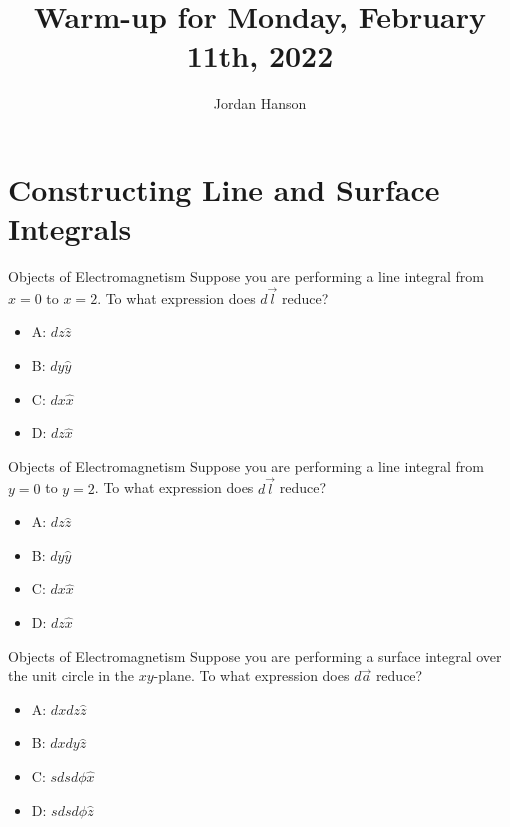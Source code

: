 \documentclass{beamer}
\title{Warm-up for Monday, February 11th, 2022}
\author{Jordan Hanson}
\institute{Whittier College Department of Physics and Astronomy}
\begin{document}
\maketitle

\section{Constructing Line and Surface Integrals}

\begin{frame}{Objects of Electromagnetism}
Suppose you are performing a line integral from $x = 0$ to $x = 2$.  To what expression does $d\vec{l}$ reduce?
\begin{itemize}
\item A: $dz \hat{z}$
\item B: $dy \hat{y}$
\item C: $dx \hat{x}$
\item D: $dz \hat{x}$
\end{itemize}
\end{frame}

\begin{frame}{Objects of Electromagnetism}
Suppose you are performing a line integral from $y = 0$ to $y = 2$.  To what expression does $d\vec{l}$ reduce?
\begin{itemize}
\item A: $dz \hat{z}$
\item B: $dy \hat{y}$
\item C: $dx \hat{x}$
\item D: $dz \hat{x}$
\end{itemize}
\end{frame}

\begin{frame}{Objects of Electromagnetism}
Suppose you are performing a surface integral over the unit circle in the $xy$-plane.  To what expression does $d\vec{a}$ reduce?
\begin{itemize}
\item A: $dx dz \hat{z}$
\item B: $dx dy \hat{z}$
\item C: $s ds d\phi \hat{x}$
\item D: $s ds d\phi \hat{z}$
\end{itemize}
\end{frame}
\end{document}
